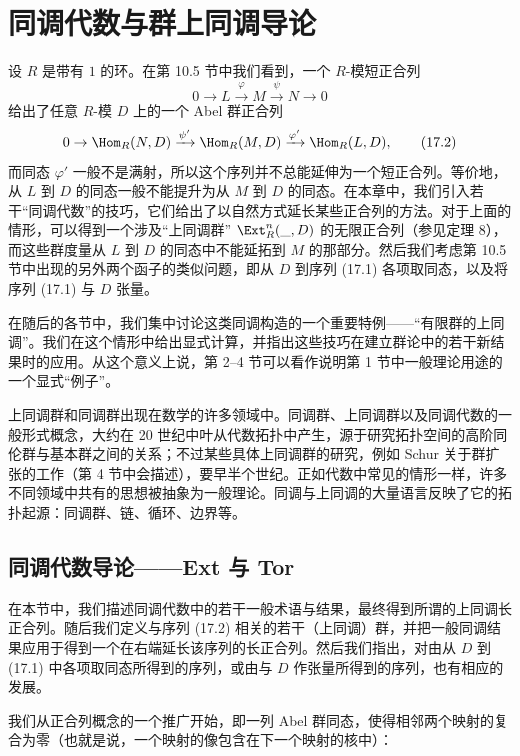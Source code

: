 
\chapter{同调代数与群上同调导论}

设 $R$ 是带有 $1$ 的环。在第 10.5 节中我们看到，一个 $R$-模短正合列
\[
  0\to L\xrightarrow{\varphi} M\xrightarrow{\psi} N\to 0
  \tag{17.1}
\]
给出了任意 $R$-模 $D$ 上的一个 Abel 群正合列
\[
  0\to \Hom_R(N,D)\xrightarrow{\psi'}\Hom_R(M,D)\xrightarrow{\varphi'}\Hom_R(L,D),
  \tag{17.2}
\]
而同态 $\varphi'$ 一般不是满射，所以这个序列并不总能延伸为一个短正合列。等价地，从 $L$ 到 $D$ 的同态一般不能提升为从 $M$ 到 $D$ 的同态。在本章中，我们引入若干“同调代数”的技巧，它们给出了以自然方式延长某些正合列的方法。对于上面的情形，可以得到一个涉及“上同调群” $\Ext_R^n(\_,D)$ 的无限正合列（参见定理 8），而这些群度量从 $L$ 到 $D$ 的同态中不能延拓到 $M$ 的那部分。然后我们考虑第 10.5 节中出现的另外两个函子的类似问题，即从 $D$ 到序列 (17.1) 各项取同态，以及将序列 (17.1) 与 $D$ 张量。

在随后的各节中，我们集中讨论这类同调构造的一个重要特例——“有限群的上同调”。我们在这个情形中给出显式计算，并指出这些技巧在建立群论中的若干新结果时的应用。从这个意义上说，第 2--4 节可以看作说明第 1 节中一般理论用途的一个显式“例子”。

上同调群和同调群出现在数学的许多领域中。同调群、上同调群以及同调代数的一般形式概念，大约在 20 世纪中叶从代数拓扑中产生，源于研究拓扑空间的高阶同伦群与基本群之间的关系；不过某些具体上同调群的研究，例如 Schur 关于群扩张的工作（第 4 节中会描述），要早半个世纪。正如代数中常见的情形一样，许多不同领域中共有的思想被抽象为一般理论。同调与上同调的大量语言反映了它的拓扑起源：同调群、链、循环、边界等。

\section{同调代数导论——Ext 与 Tor}

在本节中，我们描述同调代数中的若干一般术语与结果，最终得到所谓的上同调长正合列。随后我们定义与序列 (17.2) 相关的若干（上同调）群，并把一般同调结果应用于得到一个在右端延长该序列的长正合列。然后我们指出，对由从 $D$ 到 (17.1) 中各项取同态所得到的序列，或由与 $D$ 作张量所得到的序列，也有相应的发展。

我们从正合列概念的一个推广开始，即一列 Abel 群同态，使得相邻两个映射的复合为零（也就是说，一个映射的像包含在下一个映射的核中）：

